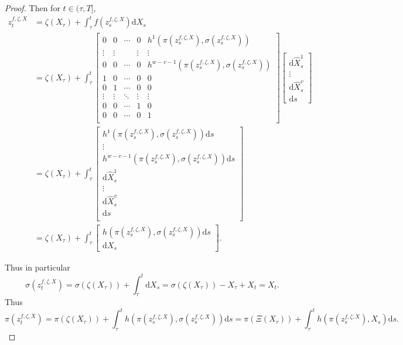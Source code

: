 \documentclass{article}
\theoremstyle{plain}
\theoremstyle{definition}
\begin{document}
\begin{proof}
	Then for $t \in (\tau, T]$,
	\begin{align*}
	z^{f, \zeta, X}_t &= \zeta(X_\tau) + \int_\tau^t f(z^{f, \zeta, X}_s) \mathrm{d}X_s\\
	&=\zeta(X_\tau) + \int_\tau^t \begin{bmatrix}
	0 & 0 & \cdots & 0 & h^1(\pi(z^{f, \zeta, X}_s), \sigma(z^{f, \zeta, X}_s))\\
	\vdots & \vdots & & \vdots & \vdots\\
	0 & 0 & \cdots & 0 & h^{w - v - 1}(\pi(z^{f, \zeta, X}_s), \sigma(z^{f, \zeta, X}_s))\\
	1 & 0 & \cdots & 0 & 0\\
	0 & 1 & \cdots & 0 & 0\\
	\vdots & \vdots & \ddots & \vdots & \vdots\\
	0 & 0 & \cdots & 1 & 0\\
	0 & 0 & \cdots & 0 & 1\\
	\end{bmatrix}
	\begin{bmatrix}
	\mathrm{d}\widehat{X}^1_s\\
	\vdots\\
	\mathrm{d}\widehat{X}^v_s\\
	\mathrm{d}s
	\end{bmatrix}\\
	&= \zeta(X_\tau) + \int_\tau^t \begin{bmatrix}
	h^1(\pi(z^{f, \zeta, X}_s), \sigma(z^{f, \zeta, X}_s)) \mathrm{d}s\\
	\vdots\\
	h^{w - v - 1}(\pi(z^{f, \zeta, X}_s), \sigma(z^{f, \zeta, X}_s)) \mathrm{d}s\\
	\mathrm{d}\widehat{X}^1_s\\
	\vdots\\
	\mathrm{d}\widehat{X}^v_s\\
	\mathrm{d}s\\
	\end{bmatrix}\\
	&= \zeta(X_\tau) + \int_\tau^t \begin{bmatrix}
	h(\pi(z^{f, \zeta, X}_s), \sigma(z^{f, \zeta, X}_s)) \mathrm{d}s\\
	\mathrm{d}X_s
	\end{bmatrix}.
	\end{align*}
	
	Thus in particular
	\begin{equation*}
	\sigma(z^{f, \zeta, X}_t) = \sigma(\zeta(X_\tau)) + \int_\tau^t \mathrm{d}X_s = \sigma(\zeta(X_\tau)) - X_\tau + X_t = X_t.
	\end{equation*}
	Thus
	\begin{equation*}
	\pi(z^{f, \zeta, X}_t) = \pi(\zeta(X_\tau)) + \int_\tau^t h(\pi(z^{f, \zeta, X}_s), \sigma(z^{f, \zeta, X}_s)) \mathrm{d}s  = \pi(\Xi(X_\tau)) + \int_\tau^t h(\pi(z^{f, \zeta, X}_s), X_s) \mathrm{d}s.
	\end{equation*}
	

\end{proof}
\end{document}
